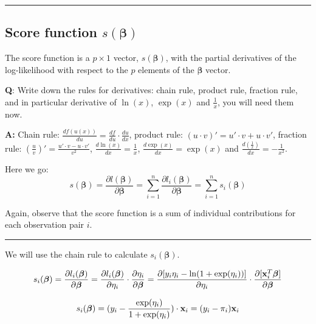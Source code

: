 \documentclass[
]{article}
\begin{document}
\begin{center}\rule{0.5\linewidth}{0.5pt}\end{center}

\hypertarget{score-function-sboldsymbolbeta}{%
\subsection{\texorpdfstring{Score function
\(s(\boldsymbol{\beta})\)}{Score function s(\textbackslash boldsymbol\{\textbackslash beta\})}}\label{score-function-sboldsymbolbeta}}

The score function is a \(p\times 1\) vector, \(s(\boldsymbol{\beta})\),
with the partial derivatives of the log-likelihood with respect to the
\(p\) elements of the \(\boldsymbol{\beta}\) vector.

\textbf{Q}: Write down the rules for derivatives: chain rule, product
rule, fraction rule, and in particular derivative of \(\ln(x)\),
\(\exp(x)\) and \(\frac{1}{x}\), you will need them now.

\textbf{A:} Chain rule:
\(\frac{d f(u(x))}{du}=\frac{df}{du}\cdot \frac{du}{dx}\), product rule:
\((u\cdot v)'=u'\cdot v+u\cdot v'\), fraction rule:
\((\frac{u}{v})'=\frac{u' \cdot v - u\cdot v'}{v^2}\),
\(\frac{d \ln(x)}{dx}=\frac{1}{x}\), \(\frac{d\exp(x)}{dx}=\exp(x)\) and
\(\frac{d(\frac{1}{x})}{dx}=-\frac{1}{x^2}\).

Here we go:
\[s(\boldsymbol{\beta})=\frac{\partial l(\boldsymbol{\beta})}{\partial \boldsymbol{\beta}}=
\sum_{i=1}^n \frac{\partial l_i(\boldsymbol{\beta})}{\partial \boldsymbol{\beta}}=
\sum_{i=1}^n s_i(\boldsymbol{\beta})\]

Again, observe that the score function is a sum of individual
contributions for each observation pair \(i\).

\begin{center}\rule{0.5\linewidth}{0.5pt}\end{center}

We will use the chain rule to calculate \(s_i(\boldsymbol{\beta})\).

\[s_i(\boldsymbol{\beta})=\frac{\partial l_i(\boldsymbol{\beta})}{\partial \boldsymbol{\beta}}=\frac{\partial l_i(\boldsymbol{\beta})}{\partial \eta_i}\cdot \frac{\partial \eta_i}{\partial \boldsymbol{\beta}}=\frac{\partial [y_i\eta_i-\ln(1+{\exp(\eta_i)})]}{\partial \eta_i}\cdot \frac{\partial [{\bf x}_i^T\boldsymbol{\beta} ]}{\partial \boldsymbol{\beta}}\]

\[s_i(\boldsymbol{\beta})=(y_i-\frac{\exp(\eta_i)}{1+\exp(\eta_i)})\cdot {\bf x}_i=(y_i-\pi_i) {\bf x}_i \]
\end{document}
